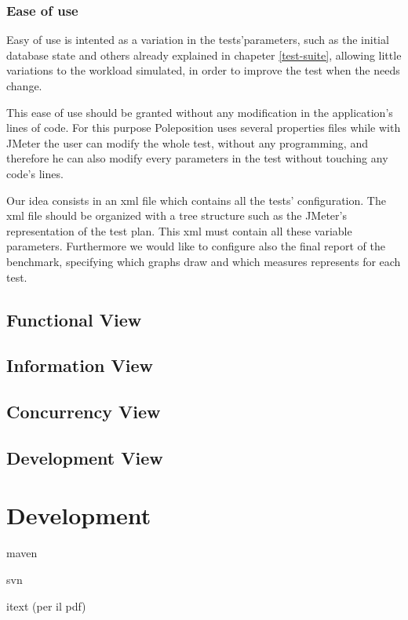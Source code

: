 			\subsubsection{Ease of use}
Easy of use is intented as a variation in the tests'parameters, such as the initial database state and others already explained in chapeter \ref{test-suite}, allowing little variations to the workload simulated, in order to improve the test when the needs change. 

This ease of use should be granted without any modification in the application's lines of code. For this purpose Poleposition uses several properties files while with JMeter the user can modify the whole test, without any programming, and therefore he can also modify every parameters in the test without touching any code's lines.

Our idea consists in an xml file which contains all the tests' configuration. The xml file should be organized with a tree structure such as the JMeter's representation of the test plan. This xml must contain all these variable parameters. Furthermore we would like to configure also the final report of the benchmark, specifying which graphs draw and which measures represents for each test.
		
		\subsection{Functional View}
		
		\subsection{Information View}
		
		\subsection{Concurrency View}
		
		\subsection{Development View}
	
	\section{Development}
	
		maven
		
		svn
		
		itext (per il pdf)
		
